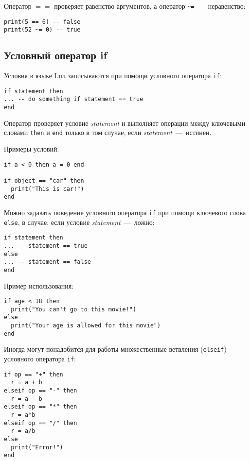 Оператор $==$ проверяет равенство аргументов, а оператор \lstinline{~=}~---~неравенство:

\begin{lstlisting}
print(5 == 6) -- false
print(52 ~= 0) -- true
\end{lstlisting}

\subsection{Условный оператор if}

Условия в языке Lua записываются при помощи условного оператора \lstinline{if}:

\begin{lstlisting}
if statement then
... -- do something if statement == true
end
\end{lstlisting}

Оператор проверяет условие \emph{statement} и выполняет операции между ключевыми словами \lstinline{then} и \lstinline{end} только в том случае, если \emph{statement}~---~истинен.

Примеры условий:

\begin{lstlisting}
if a < 0 then a = 0 end

if object == "car" then
  print("This is car!")
end
\end{lstlisting}

Можно задавать поведение условного оператора \lstinline{if} при помощи ключевого слова \lstinline{else}, в случае, если условие \emph{statement}~---~ложно:

\begin{lstlisting}
if statement then
... -- statement == true
else
... -- statement == false
end
\end{lstlisting}

Пример использования:

\begin{lstlisting}
if age < 18 then
  print("You can't go to this movie!")
else
  print("Your age is allowed for this movie")
end
\end{lstlisting}

Иногда могут понадобится для работы множественные ветвления (\lstinline{elseif}) условного оператора \lstinline{if}:

\begin{lstlisting}
if op == "+" then
  r = a + b
elseif op == "-" then
  r = a - b
elseif op == "*" then
  r = a*b
elseif op == "/" then
  r = a/b
else
  print("Error!")
end
\end{lstlisting}

